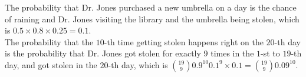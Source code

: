 \begin{pr}
The probability that Dr. Jones purchased a new umbrella on a day is the chance of raining and Dr. Jones visiting the library and the umbrella being stolen, which is $0.5\times0.8\times0.25=0.1$.\\
The probability that the $10$-th time getting stolen happens right on the $20$-th day is the probability that Dr. Jones got stolen for exactly $9$ times in the $1$-st to $19$-th day, and got stolen in the $20$-th day, which is $\binom{19}90.9^{10}0.1^9\times0.1=\binom{19}90.09^{10}$.
\end{pr}
